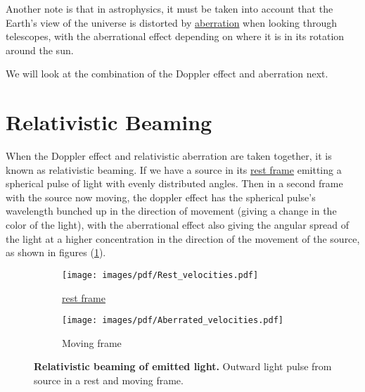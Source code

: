 Another note is that in astrophysics, it must be taken into account that the Earth's view of the universe is distorted by \hyperlink{def-aberration}{aberration} when looking through telescopes, with the aberrational effect depending on where it is in its rotation around the sun.

We will look at the combination of the Doppler effect and aberration next.


\section{Relativistic Beaming} \label{sect: Intro Relativistic Beaming}

When the Doppler effect and relativistic aberration are taken together, it is known as relativistic beaming.
If we have a source in its \hyperlink{def-proper-frame}{rest frame} emitting a spherical pulse of light with evenly distributed angles.
Then in a second frame with the source now moving, the doppler effect has the spherical pulse's wavelength bunched up in the direction of movement (giving a change in the color of the light), with the aberrational effect also giving the angular spread of the light at a higher concentration in the direction of the movement of the source, as shown in figures (\ref{fig: Relativistic Beaming}).

\begin{figure}[H]
	\begin{subfigure}{.49\textwidth}
		\centering
		\texttt{[image: images/pdf/Rest\_velocities.pdf]}
		\caption{\hyperlink{def-proper-frame}{rest frame}}
	\end{subfigure}
	\begin{subfigure}{.49\textwidth}
		\centering
		\texttt{[image: images/pdf/Aberrated\_velocities.pdf]}
		\caption{Moving frame}
	\end{subfigure}
	\caption{\textbf{Relativistic beaming of emitted light.} Outward light pulse from source in a rest and moving frame.}
	\label{fig: Relativistic Beaming}
\end{figure}


